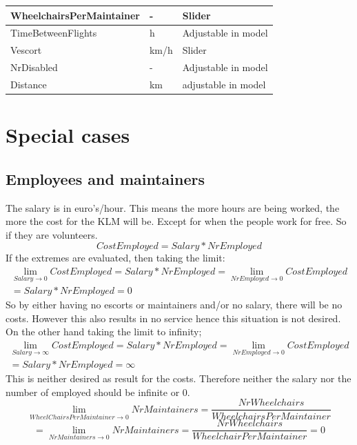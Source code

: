 \documentclass[a4paper, 11pt, notitlepage]{report}
\begin{document}
\begin{table}[h]
\begin{tabular}{|l|l|l|}
\\ \hline
WheelchairsPerMaintainer & -        & Slider                                                             \\ \hline
TimeBetweenFlights       & h        & Adjustable in model
\\ \hline
Vescort                  & km/h     & Slider                                                             \\ \hline
NrDisabled               & -        & Adjustable in model 
\\ \hline
Distance                 & km       & adjustable in model                                                             \\ \hline
\end{tabular}
\end{table}
\chapter{Special cases}
\section{Employees and maintainers}
The salary is in euro's/hour. This means the more hours are being worked, the more the cost for the KLM will be. Except for when the people work for free. So if they are volunteers.\\
\begin{equation}
CostEmployed = Salary * NrEmployed
\end{equation}
If the extremes are evaluated, then taking the limit:
\begin{multline}
\lim_{Salary \rightarrow 0}CostEmployed = Salary * NrEmployed = \lim_{NrEmployed \rightarrow 0}CostEmployed \\ = Salary * NrEmployed = 0
\end{multline}
So by either having no escorts or maintainers and/or no salary, there will be no costs. However this also results in no service hence this situation is not desired. On the other hand taking the limit to infinity;
\begin{multline}
\lim_{Salary \rightarrow \infty} CostEmployed = Salary * NrEmployed = \lim_{NrEmployed \rightarrow 0} CostEmployed \\ = Salary * NrEmployed = \infty
\end{multline}
This is neither desired as result for the costs. Therefore neither the salary nor the number of employed should be infinite or 0.
\begin{equation}
\lim_{WheelChairsPerMaintainer \rightarrow 0} NrMaintainers = \frac{NrWheelchairs}{WheelchairsPerMaintainer}
\end{equation}
\begin{equation}
= \lim_{NrMaintainers \rightarrow 0}NrMaintainers = \frac{NrWheelchairs}{WheelchairPerMaintainer} = 0
\end{equation}
\end{document}
